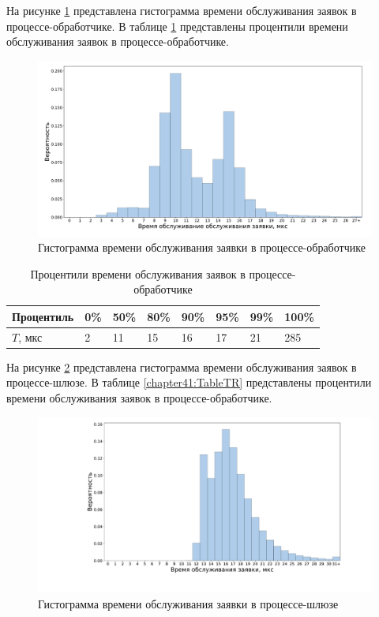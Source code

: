 На рисунке \ref{chapter41:EngineLatency} представлена гистограмма времени обслуживания заявок в процессе-обработчике. В таблице \ref{chapter41:TableEngine} представлены процентили времени обслуживания заявок в процессе-обработчике.
\begin{figure}[!h]
\caption{Гистограмма времени обслуживания заявки в процессе-обработчике}
\label{chapter41:EngineLatency}
\includegraphics[width=\textwidth]{../../graphics/hist/Engine}
\end{figure}

\begin{table}[!h]
\caption{Процентили времени обслуживания заявок в процессе-обработчике}\label{chapter41:TableEngine}
\centering
\begin{tabular}{|l|l|l|l|l|l|l|l|}
\hline
Процентиль & 0\% & 50\% & 80\% & 90\% & 95\% & 99\% & 100\% \\ \hline
$T$, мкс & 2 & 11 & 15 & 16 & 17 & 21 & 285 \\ \hline
\end{tabular}
\end{table}

На рисунке \ref{chapter41:TRLatency} представлена гистограмма времени обслуживания заявок в процессе-шлюзе. В таблице \ref{chapter41:TableTR} представлены процентили времени обслуживания заявок в процессе-обработчике.
\begin{figure}[!h]
\caption{Гистограмма времени обслуживания заявки в процессе-шлюзе}
\label{chapter41:TRLatency}
\includegraphics[width=\textwidth]{../../graphics/hist/TR}
\end{figure}

